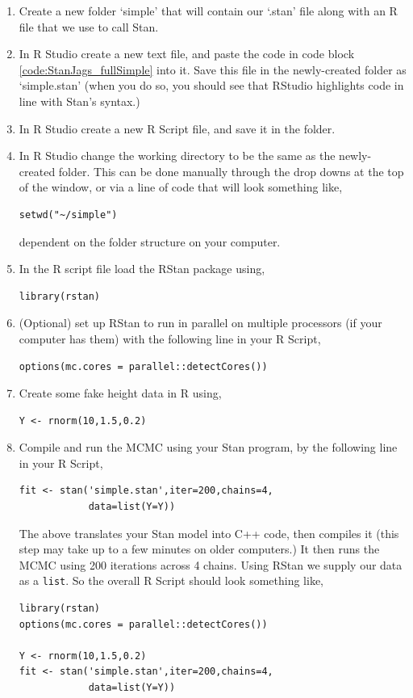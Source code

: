 \documentclass[11pt,fullpage]{book}
\begin{document}
\begin{enumerate}
\item Create a new folder `simple' that will contain our `.stan' file along with an R file that we use to call Stan.
\item In R Studio create a new text file, and paste the code in code block \ref{code:StanJags_fullSimple} into it. Save this file in the newly-created folder as `simple.stan' (when you do so, you should see that RStudio highlights code in line with Stan's syntax.)
\item In R Studio create a new R Script file, and save it in the folder.
\item In R Studio change the working directory to be the same as the newly-created folder. This can be done manually through the drop downs at the top of the window, or via a line of code that will look something like,
\begin{verbatim}
setwd("~/simple")
\end{verbatim}
dependent on the folder structure on your computer.
\item In the R script file load the RStan package using,
\begin{verbatim}
library(rstan)
\end{verbatim}
\item (Optional) set up RStan to run in parallel on multiple processors (if your computer has them) with the following line in your R Script,
\begin{verbatim}
options(mc.cores = parallel::detectCores())
\end{verbatim}
\item Create some fake height data in R using,
\begin{verbatim}
Y <- rnorm(10,1.5,0.2)
\end{verbatim}
\item Compile and run the MCMC using your Stan program, by the following line in your R Script,
\begin{verbatim}
fit <- stan('simple.stan',iter=200,chains=4,
            data=list(Y=Y))
\end{verbatim}
The above translates your Stan model into C++ code, then compiles it (this step may take up to a few minutes on older computers.) It then runs the MCMC using 200 iterations across 4 chains. Using RStan we supply our data as a \texttt{list}. So the overall R Script should look something like,
\begin{verbatim}
library(rstan)
options(mc.cores = parallel::detectCores())

Y <- rnorm(10,1.5,0.2)
fit <- stan('simple.stan',iter=200,chains=4,
            data=list(Y=Y))
\end{verbatim}
\end{enumerate}
\end{document}
